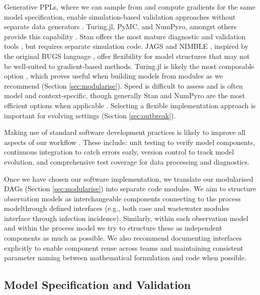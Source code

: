 \documentclass{article}
\begin{document}
Generative \ac{PPL}s, where we can sample from and compute gradients for the same model specification, enable simulation-based validation approaches without separate data generators  \citet{vstrumbelj2024past}.
Turing.jl, PyMC, and NumPyro, amongst others provide this capability \citep{ge2018turing,fjelde2025turing,abril2023pymc,phan2019composable}.
Stan offers the most mature diagnostic and validation tools \citep{carpenter2017stan}, but requires separate simulation code.
JAGS and NIMBLE \citep{plummer2003jags,de2017programming}, inspired by the original BUGS language \citep{lunn2013bugs}, offer flexibility for model structures that may not be well-suited to gradient-based methods.
Turing.jl is likely the most composable option \citep{ge2018turing}, which proves useful when building models from modules as we recommend (Section \ref{sec:modularise}).
Speed is difficult to assess and is often model and context-specific, though generally Stan and NumPyro are the most efficient options when applicable \citep{carpenter2017stan,phan2019composable}.
Selecting a flexible implementation approach is important for evolving settings (Section \ref{sec:outbreak}).

Making use of standard software development practices is likely to improve all aspects of our workflow \citep{gelman2020bayesian}.
These include: unit testing to verify model components, continuous integration to catch errors early, version control to track model evolution, and comprehensive test coverage for data processing and diagnostics.


Once we have chosen our software implementation, we translate our modularised \ac{DAG}s (Section \ref{sec:modularise}) into separate code modules.
We aim to structure observation models as interchangeable components connecting to the process modelthrough defined interfaces (e.g., both case and wastewater modules interface through infection incidence). Similarly, within each observation model and within the process model we try to structure these as independent components as much as possible. We also recommend documenting interfaces explicitly to enable component reuse across teams and maintaining consistent parameter naming between mathematical formulation and code when possible.

\subsection{Model Specification and Validation}\label{sec:spec-validate}
\end{document}
